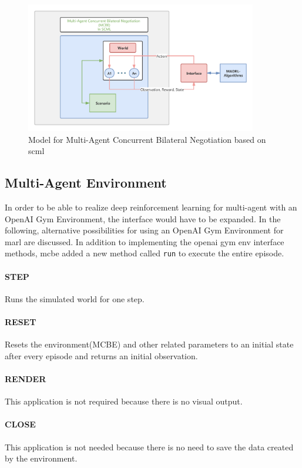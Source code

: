 \begin{figure}[htbp]
\centering
\includegraphics[width=0.9\textwidth]{./images/MCBE.png}
\caption{Model for Multi-Agent Concurrent Bilateral Negotiation based on \gls{scml}}
\label{fig:environment-multi-agent}
\end{figure}

\subsection{Multi-Agent Environment} \label{multi-agent-env}
In order to be able to realize deep reinforcement learning for multi-agent with an OpenAI Gym Environment, the interface would have to be expanded. In the following, alternative possibilities for using an OpenAI Gym Environment for \gls{marl} are discussed. 
In addition to implementing the \gls{openai gym} env interface methods, \gls{mcbe} added a new method called \texttt{run} to execute the entire episode.
\paragraph{STEP} Runs the simulated world for one step.
\paragraph{RESET} Resets the environment(MCBE) and other related parameters to an initial state after every episode and returns an initial observation.
\paragraph{RENDER} This application is not required because there is no visual output.
\paragraph{CLOSE} This application is not needed because there is no need to save the data created by
the environment.
